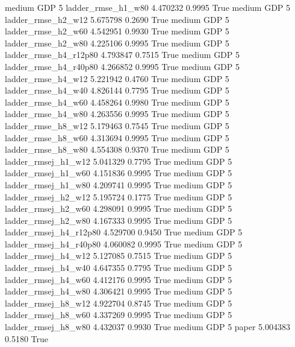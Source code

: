     medium      GDP                 5     ladder_rmse_h1_w80   4.470232      0.9995    True
    medium      GDP                 5     ladder_rmse_h2_w12   5.675798      0.2690    True
    medium      GDP                 5     ladder_rmse_h2_w60   4.542951      0.9930    True
    medium      GDP                 5     ladder_rmse_h2_w80   4.225106      0.9995    True
    medium      GDP                 5  ladder_rmse_h4_r12p80   4.793847      0.7515    True
    medium      GDP                 5  ladder_rmse_h4_r40p80   4.266852      0.9995    True
    medium      GDP                 5     ladder_rmse_h4_w12   5.221942      0.4760    True
    medium      GDP                 5     ladder_rmse_h4_w40   4.826144      0.7795    True
    medium      GDP                 5     ladder_rmse_h4_w60   4.458264      0.9980    True
    medium      GDP                 5     ladder_rmse_h4_w80   4.263556      0.9995    True
    medium      GDP                 5     ladder_rmse_h8_w12   5.179463      0.7545    True
    medium      GDP                 5     ladder_rmse_h8_w60   4.313694      0.9995    True
    medium      GDP                 5     ladder_rmse_h8_w80   4.554308      0.9370    True
    medium      GDP                 5    ladder_rmsej_h1_w12   5.041329      0.7795    True
    medium      GDP                 5    ladder_rmsej_h1_w60   4.151836      0.9995    True
    medium      GDP                 5    ladder_rmsej_h1_w80   4.209741      0.9995    True
    medium      GDP                 5    ladder_rmsej_h2_w12   5.195724      0.1775    True
    medium      GDP                 5    ladder_rmsej_h2_w60   4.298091      0.9995    True
    medium      GDP                 5    ladder_rmsej_h2_w80   4.167333      0.9995    True
    medium      GDP                 5 ladder_rmsej_h4_r12p80   4.529700      0.9450    True
    medium      GDP                 5 ladder_rmsej_h4_r40p80   4.060082      0.9995    True
    medium      GDP                 5    ladder_rmsej_h4_w12   5.127085      0.7515    True
    medium      GDP                 5    ladder_rmsej_h4_w40   4.647355      0.7795    True
    medium      GDP                 5    ladder_rmsej_h4_w60   4.412176      0.9995    True
    medium      GDP                 5    ladder_rmsej_h4_w80   4.306421      0.9995    True
    medium      GDP                 5    ladder_rmsej_h8_w12   4.922704      0.8745    True
    medium      GDP                 5    ladder_rmsej_h8_w60   4.337269      0.9995    True
    medium      GDP                 5    ladder_rmsej_h8_w80   4.432037      0.9930    True
    medium      GDP                 5                  paper   5.004383      0.5180    True
